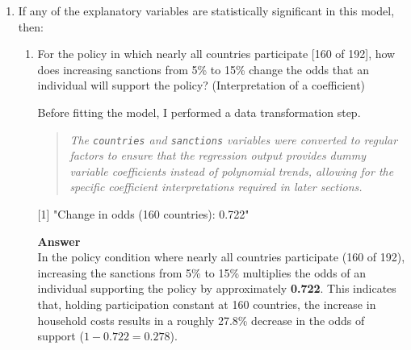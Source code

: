 \documentclass[12pt,letterpaper]{article}
\begin{document}
\begin{enumerate}
\begin{enumerate}
			\subsection*{Conclusion}
			
			The Global Null Hypothesis ($H_0$) for this model states that none of the explanatory variables (country participation and sanctions) influence the probability of an individual supporting the policy ($\beta_1 = \beta_2 = \beta_3 = \beta_4 = \beta_5 = 0$). That is, neither the number of participating countries nor the level of sanctions has any effect on the likelihood of policy support. Based on the Likelihood-Ratio Test results ($p < 2.2 \times 10^{-16}$), we strongly reject the global null hypothesis. We conclude that the additive model provides a significantly better fit than the null model and that a policy is most likely to gain support when it involves a high number of participating countries while keeping household-level sanctions at a minimum.
			
		\end{enumerate}
		\newpage
		\item
		If any of the explanatory variables are statistically significant in this model, then:
		\begin{enumerate}
			\item
			For the policy in which nearly all countries participate [160 of 192], how does increasing sanctions from 5\% to 15\% change the odds that an individual will support the policy? (Interpretation of a coefficient)
			
			Before fitting the model, I performed a data transformation step.
			\begin{quote}
				\textit{The \texttt{countries} and \texttt{sanctions} variables were converted to regular factors to ensure that the regression output provides dummy variable coefficients instead of polynomial trends, allowing for the specific coefficient interpretations required in later sections.}
			\end{quote}
			
			
			
			[1] "Change in odds (160 countries): 0.722"
			\vspace{0.5cm}
			
			\noindent \textbf{Answer} \\
			In the policy condition where nearly all countries participate (160 of 192), increasing the sanctions from 5\% to 15\% multiplies the odds of an individual supporting the policy by approximately \textbf{0.722}. This indicates that, holding participation constant at 160 countries, the increase in household costs results in a roughly 27.8\% decrease in the odds of support ($1 - 0.722 = 0.278$).
			\vspace{0.5cm}
			

\end{enumerate}
\end{enumerate}
\end{document}
